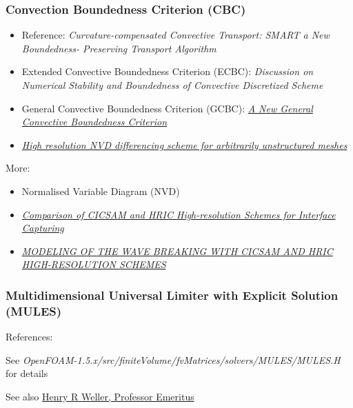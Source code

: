 \subsubsection{Convection Boundedness Criterion (CBC)}

\sloppy
\begin{itemize}
    \item Reference: \textit{Curvature-compensated Convective Transport: SMART a New Boundedness- Preserving Transport Algorithm}
    \item Extended Convective Boundedness Criterion (ECBC): \textit{Discussion on Numerical Stability and Boundedness of Convective Discretized Scheme}
    \item General Convective Boundedness Criterion (GCBC): \textit{\href{http://gr.xjtu.edu.cn:8080/upload/PUB.1673.4/Wei_NHT.pdf}{A New General Convective Boundedness Criterion}}
    \item {} \textit{\href{http://powerlab.fsb.hr/ped/kturbo/openfoam/papers/GammaPaper.pdf}{High resolution NVD differencing scheme for arbitrarily unstructured meshes}}
\end{itemize}
\fussy

More:
\begin{itemize}
    \item Normalised Variable Diagram (NVD)
    \item \textit{\href{http://warminski.pollub.plwww.ptmts.org.pl/Waclaw-Koron-2-08.pdf}{Comparison of CICSAM and HRIC High-resolution Schemes for Interface Capturing}}
    \item \textit{\href{http://proceedings.fyper.com/eccomascfd2006/documents/85.pdf}{MODELING OF THE WAVE BREAKING WITH CICSAM AND HRIC HIGH-RESOLUTION SCHEMES}}
\end{itemize}

\subsubsection{Multidimensional Universal Limiter with Explicit Solution (MULES)}

References: \citep{Berberovi2009,Kissling2010}

See \textit{OpenFOAM-1.5.x/src/finiteVolume/fvMatrices/solvers/MULES/MULES.H} for details

See also \href{http://fds.duke.edu/db/aas/Physics/weller}{Henry R Weller, Professor Emeritus}


